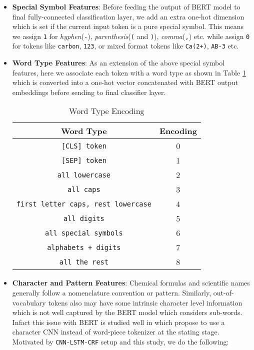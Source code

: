 \begin{itemize}
    \item \textbf{Special Symbol Features}: Before feeding the output of BERT model to final fully-connected classification layer, we add an extra one-hot dimension which is set if the current input token is a pure special symbol. This means we assign \texttt{1} for \textit{hyphen}(\texttt{-}), \textit{parenthesis}(\texttt{(} and \texttt{)}), \textit{comma}(\texttt{,}) etc. while assign \texttt{0} for tokens like \texttt{carbon}, \texttt{123}, or mixed format tokens like \texttt{Ca(2+)}, \texttt{AB-3} etc.
    
    \item \textbf{Word Type Features}: As an extension of the above special symbol features, here we associate each token with a word type as shown in Table \ref{tab:word_type_encoding} which is converted into a one-hot vector concatenated with BERT output embeddings before sending to final classifier layer.
    
    \begin{table}[h!]
    \centering
    \begin{tabular}{|c|c|}\hline
    	\textbf{Word Type} & \textbf{Encoding}\\\hline
    	\texttt{[CLS] token} & 0\\\hline
    	\texttt{[SEP] token} & 1\\\hline
    	\texttt{all lowercase} & 2\\\hline
    	\texttt{all caps} & 3\\\hline
    	\texttt{first letter caps, rest lowercase} & 4\\\hline
    	\texttt{all digits} & 5\\\hline
    	\texttt{all special symbols} & 6\\\hline
    	\texttt{alphabets + digits} & 7\\\hline
    	\texttt{all the rest} & 8\\\hline
    	\end{tabular}
        \caption{Word Type Encoding}
        \label{tab:word_type_encoding}
    \end{table}
    
    \item \textbf{Character and Pattern Features}: Chemical formulas and scientific names generally follow a nomenclature convention or pattern. Similarly, out-of-vocabulary tokens also may have some intrinsic character level information which is not well captured by the BERT model which considers sub-words. Infact this issue with BERT is studied well in \cite{boukkouri2020characterbert} which propose to use a character CNN instead of word-piece tokenizer at the stating stage. Motivated by \texttt{CNN-LSTM-CRF} setup and this study, we do the following:
    

\end{itemize}
